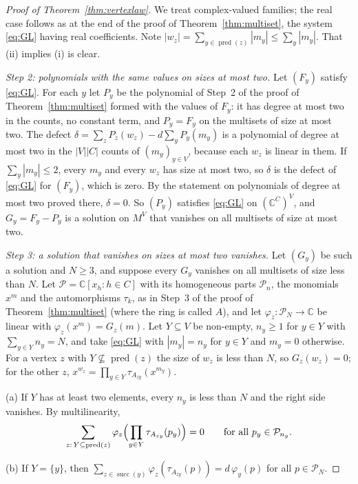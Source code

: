 \begin{proof}[Proof of Theorem~\ref{thm:vertexlaw}]
We treat complex-valued families; the real case follows as at the end of the proof of Theorem~\ref{thm:multiset}, the system \eqref{eq:GL} having real coefficients. Note $|w_z|=\sum_{y\in\operatorname{pred}(z)}|m_y|\le\sum_y|m_y|$. That (ii) implies (i) is clear.

\emph{Step 2: polynomials with the same values on sizes at most two.} Let $(F_y)$ satisfy \eqref{eq:GL}. For each $y$ let $P_y$ be the polynomial of Step~2 of the proof of Theorem~\ref{thm:multiset} formed with the values of $F_y$: it has degree at most two in the counts, no constant term, and $P_y=F_y$ on the multisets of size at most two. The defect $\delta=\sum_zP_z(w_z)-d\sum_yP_y(m_y)$ is a polynomial of degree at most two in the $|V||C|$ counts of $(m_y)_{y\in V}$, because each $w_z$ is linear in them. If $\sum_y|m_y|\le2$, every $m_y$ and every $w_z$ has size at most two, so $\delta$ is the defect of \eqref{eq:GL} for $(F_y)$, which is zero. By the statement on polynomials of degree at most two proved there, $\delta=0$. So $(P_y)$ satisfies \eqref{eq:GL} on $(\mathbb{C}^C)^V$, and $G_y=F_y-P_y$ is a solution on $M^V$ that vanishes on all multisets of size at most two.

\emph{Step 3: a solution that vanishes on sizes at most two vanishes.} Let $(G_y)$ be such a solution and $N\ge3$, and suppose every $G_y$ vanishes on all multisets of size less than $N$. Let $\mathcal{P}=\mathbb{C}[x_h:h\in C]$ with its homogeneous parts $\mathcal{P}_n$, the monomials $x^m$ and the automorphisms $\tau_k$, as in Step~3 of the proof of Theorem~\ref{thm:multiset} (where the ring is called $A$), and let $\varphi_z\colon\mathcal{P}_N\to\mathbb{C}$ be linear with $\varphi_z(x^m)=G_z(m)$. Let $Y\subseteq V$ be non-empty, $n_y\ge1$ for $y\in Y$ with $\sum_{y\in Y}n_y=N$, and take \eqref{eq:GL} with $|m_y|=n_y$ for $y\in Y$ and $m_y=0$ otherwise. For a vertex $z$ with $Y\not\subseteq\operatorname{pred}(z)$ the size of $w_z$ is less than $N$, so $G_z(w_z)=0$; for the other $z$, $x^{w_z}=\prod_{y\in Y}\tau_{A_{zy}}(x^{m_y})$.

(a) If $Y$ has at least two elements, every $n_y$ is less than $N$ and the right side vanishes. By multilinearity,
\[
\sum_{z:\,Y\subseteq\operatorname{pred}(z)}\varphi_z\Bigl(\prod_{y\in Y}\tau_{A_{zy}}(p_y)\Bigr)=0\qquad\text{for all }p_y\in\mathcal{P}_{n_y}.
\]

(b) If $Y=\{y\}$, then $\sum_{z\in\operatorname{succ}(y)}\varphi_z(\tau_{A_{zy}}(p))=d\,\varphi_y(p)$ for all $p\in\mathcal{P}_N$.


\end{proof}
